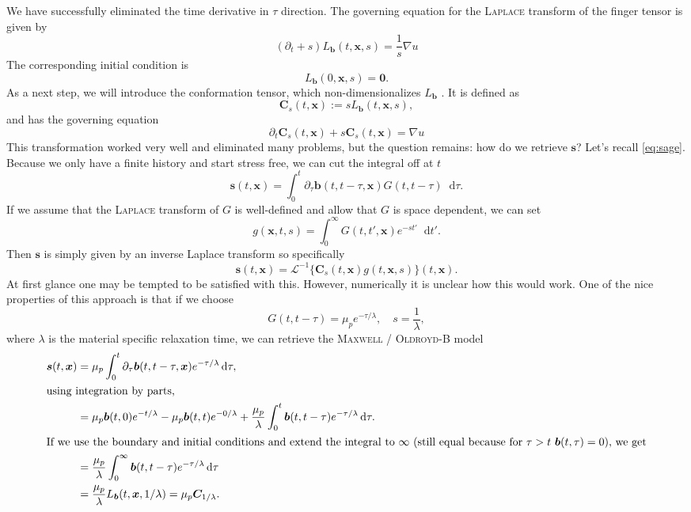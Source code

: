 \documentclass[12pt,a4paper,twoside, open=right]{scrreprt}
\theoremstyle{definition}
\theoremstyle{plain}
\newcommand{\bfb}{\bm{b}}
\newcommand{\bfs}{\bm{s}}
\newcommand{\bfC}{\bm{C}}
\newcommand{\bfx}{\bm{x}}
\newcommand{\D}{\mathop{}\!\mathrm{d}}
\begin{document}
We have successfully eliminated the time derivative in $\tau$ direction. The governing equation for the \textsc{Laplace} transform of the finger tensor is given by
\begin{equation}
(\partial_t +s)L_{\bfb}(t,\bfx,s) = \frac{1}{s}\nabla u
\end{equation}
The corresponding initial condition is 
\begin{equation}
    L_{\bfb}(0,\bfx,s) = \bm{0}.
\end{equation} 
As a next step, we will introduce the conformation tensor, which non-dimensionalizes $L_{\bfb}$ . It is defined as 
\begin{equation}
    \bfC_s(t,\bfx) := sL_{\bfb}(t,\bfx,s),
\end{equation}
and has the governing equation
\begin{equation}
    \partial_t\bfC_s(t,\bfx)+s\bfC_s(t,\bfx) =\nabla u
\end{equation}
This transformation worked very well and eliminated many problems, but the question remains: how do we retrieve $\bfs$?
Let's recall \eqref{eq:sage}.
Because we only have a finite history and start stress free, we can cut the integral off at $t$
\begin{equation}
    \bfs(t,\bfx)=\int_0^t\partial_\tau\bfb(t,t-\tau,\bfx)G(t,t-\tau)\D\tau.\label{eq:sagered}
\end{equation}
If we assume that the \textsc{Laplace} transform of $G$ is well-defined and allow that $G$ is space dependent, we can set
\begin{equation}
    g(\bfx,t,s) =\int_0^\infty G(t,t',\bfx)e^{-st'}\D t'.
\end{equation}
Then $\bfs$ is simply given by an inverse Laplace transform so specifically
\begin{equation}
    \bfs(t,\bfx) =\mathcal{L}^{-1}\{\bfC_s(t,\bfx)g(t,\bfx,s)\}(t,\bfx).
\end{equation}
At first glance one may be tempted to be satisfied with this. However, numerically it is unclear how this would work. One of the nice properties of this approach is that if we choose 
\begin{equation}
    G(t,t-\tau)= \mu_p e^{-\tau/\lambda},\quad s=\frac{1}{\lambda},
\end{equation}
where $\lambda$ is the material specific relaxation time, we can retrieve the \textsc{Maxwell} / \textsc{Oldroyd}-B model 
\begin{align}
    \bfs(t,\bfx)&=\mu_p\int_0^t\partial_\tau\bfb(t,t-\tau,\bfx)e^{-\tau/\lambda}\D\tau,\\
    \intertext{using integration by parts,}
    &=\mu_p\bfb(t,0)e^{-t/\lambda}-\mu_p\bfb(t,t)e^{-0/\lambda}+\frac{\mu_p}{\lambda}\int_0^t\bfb(t,t-\tau)e^{-\tau/\lambda}\D\tau.\\
    \intertext{If we use the boundary and initial conditions and extend the integral to $\infty$ (still equal because for $\tau>t$ $\bfb(t,\tau)=0$), we get}
    &=\frac{\mu_p}{\lambda}\int_0^\infty\bfb(t,t-\tau)e^{-\tau/\lambda}\D\tau\\
    &=\frac{\mu_p}{\lambda}L_{\bfb}(t,\bfx,1/\lambda) = \mu_p\bfC_{1/\lambda}.
\end{align}
\end{document}

